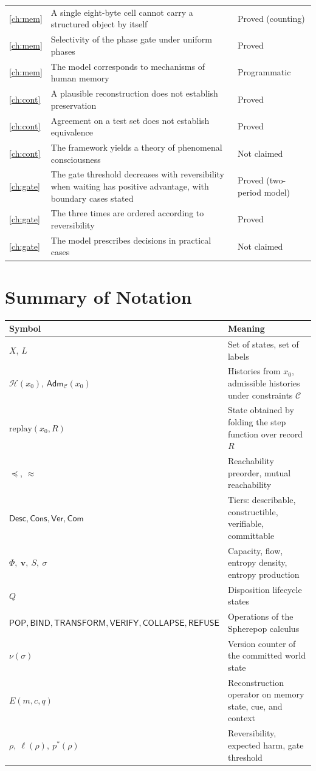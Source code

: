 \documentclass[11pt,twoside,openright]{book}
\theoremstyle{plain}
\theoremstyle{definition}
\theoremstyle{remark}
\newcommand{\Hist}{\mathcal{H}}
\newcommand{\Adm}{\mathsf{Adm}}
\newcommand{\Desc}{\mathsf{Desc}}
\newcommand{\Cons}{\mathsf{Cons}}
\newcommand{\Ver}{\mathsf{Ver}}
\newcommand{\Com}{\mathsf{Com}}
\newcommand{\replay}{\mathrm{replay}}
\newcommand{\pop}{\mathsf{POP}}
\newcommand{\refuse}{\mathsf{REFUSE}}
\newcommand{\bind}{\mathsf{BIND}}
\newcommand{\transform}{\mathsf{TRANSFORM}}
\newcommand{\verify}{\mathsf{VERIFY}}
\newcommand{\collapse}{\mathsf{COLLAPSE}}
\begin{document}
\begin{center}
\begin{tabularx}{\textwidth}{@{}p{}Xp{}@{}}
\ref{ch:mem} & A single eight-byte cell cannot carry a structured object by itself & Proved (counting)\\
\ref{ch:mem} & Selectivity of the phase gate under uniform phases & Proved\\
\ref{ch:mem} & The model corresponds to mechanisms of human memory & Programmatic\\
\ref{ch:cont} & A plausible reconstruction does not establish preservation & Proved\\
\ref{ch:cont} & Agreement on a test set does not establish equivalence & Proved\\
\ref{ch:cont} & The framework yields a theory of phenomenal consciousness & Not claimed\\
\ref{ch:gate} & The gate threshold decreases with reversibility when waiting has positive advantage, with boundary cases stated & Proved (two-period model)\\
\ref{ch:gate} & The three times are ordered according to reversibility & Proved\\
\ref{ch:gate} & The model prescribes decisions in practical cases & Not claimed\\
\bottomrule
\end{tabularx}
\end{center}

\chapter{Summary of Notation}

\begin{center}
\small
\begin{tabularx}{\textwidth}{@{}lX@{}}
\toprule
Symbol & Meaning\\
\midrule
$X$, $L$ & Set of states, set of labels\\
$\Hist(x_0)$, $\Adm_{\mathcal{C}}(x_0)$ & Histories from $x_0$, admissible histories under constraints $\mathcal{C}$\\
$\replay(x_0,R)$ & State obtained by folding the step function over record $R$\\
$\preceq$, $\approx$ & Reachability preorder, mutual reachability\\
$\Desc,\Cons,\Ver,\Com$ & Tiers: describable, constructible, verifiable, committable\\
$\Phi,\ \mathbf{v},\ S,\ \sigma$ & Capacity, flow, entropy density, entropy production\\
$Q$ & Disposition lifecycle states\\
$\pop,\bind,\transform,\verify,\collapse,\refuse$ & Operations of the Spherepop calculus\\
$\nu(\sigma)$ & Version counter of the committed world state\\
$E(m,c,q)$ & Reconstruction operator on memory state, cue, and context\\
$\rho,\ \ell(\rho),\ p^*(\rho)$ & Reversibility, expected harm, gate threshold\\
\bottomrule
\end{tabularx}
\end{center}
\end{document}
